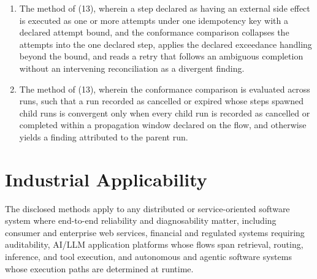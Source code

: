 \documentclass[11pt]{article}
\begin{document}
\begin{enumerate}[label=\arabic*.]
\item The method of (13), wherein a step declared as having an external side effect is executed as one or more attempts under one idempotency key with a declared attempt bound, and the conformance comparison collapses the attempts into the one declared step, applies the declared exceedance handling beyond the bound, and reads a retry that follows an ambiguous completion without an intervening reconciliation as a divergent finding.
\item The method of (13), wherein the conformance comparison is evaluated across runs, such that a run recorded as cancelled or expired whose steps spawned child runs is convergent only when every child run is recorded as cancelled or completed within a propagation window declared on the flow, and otherwise yields a finding attributed to the parent run.
\end{enumerate}

\section{Industrial Applicability}
The disclosed methods apply to any distributed or service-oriented software system where end-to-end reliability and diagnosability matter, including consumer and enterprise web services, financial and regulated systems requiring auditability, AI/LLM application platforms whose flows span retrieval, routing, inference, and tool execution, and autonomous and agentic software systems whose execution paths are determined at runtime.
\end{document}
